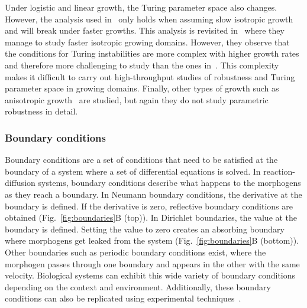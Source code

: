 Under logistic and linear growth, the Turing parameter space also changes.
However, the analysis used in~\cite{gaffney2010} only holds when assuming slow isotropic growth and will break under faster growths.
This analysis is revisited in~\cite{Klika2017} where they manage to study faster isotropic growing domains.
However, they observe that the conditions for Turing instabilities are more complex with higher growth rates and therefore more challenging to study than the ones in~\cite{gaffney2010}.
This complexity makes it difficult to carry out high-throughput studies of robustness and Turing parameter space in growing domains.
Finally, other types of growth such as anisotropic growth~\parencite{Krause2019} are studied, but again they do not study parametric robustness in detail.

\subsubsection{Boundary conditions}\label{boundary_conditions_intro}
Boundary conditions are a set of conditions that need to be satisfied at the boundary of a system where a set of differential equations is solved.
In reaction-diffusion systems, boundary conditions describe what happens to the morphogens as they reach a boundary.
In Neumann boundary conditions, the derivative at the boundary is defined.
If the derivative is zero, reflective boundary conditions are obtained (Fig.~\ref{fig:boundaries}B (top)).
In Dirichlet boundaries, the value at the boundary is defined.
Setting the value to zero creates an absorbing boundary where morphogens get leaked from the system (Fig.~\ref{fig:boundaries}B (bottom)).
Other boundaries such as periodic boundary conditions exist, where the morphogen passes through one boundary and appears in the other with the same velocity.
Biological systems can exhibit this wide variety of boundary conditions depending on the context and environment.
Additionally, these boundary conditions can also be replicated using experimental techniques~\parencite{Krause2020, Sheth2012, Vahey2014}.

